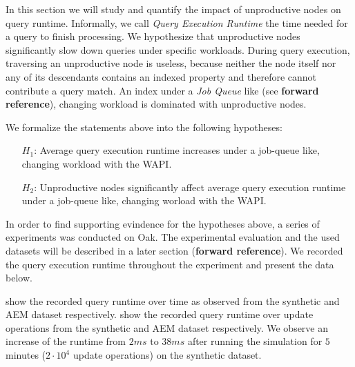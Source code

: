 \documentclass[abstracton,12pt]{scrartcl}
\theoremstyle{definition}
\begin{document}
In this section we will study and quantify the impact of unproductive nodes on
query runtime. Informally, we call \textit{Query Execution Runtime} the time
needed for a query to finish processing. We hypothesize that unproductive nodes
significantly slow down queries under specific workloads. During query
execution, traversing an unproductive node is
useless, because neither the node itself nor any of its descendants contains
an indexed property and therefore cannot contribute a query match.
An index under a \textit{Job Queue} like (see \textbf{forward reference}),
changing workload is dominated with unproductive nodes.

We formalize the statements above into the following hypotheses:

\begin{shaded}
  \begin{itemize}
  \item[$H_1$:] Average query execution runtime increases under a job-queue
    like, changing workload with the WAPI.
  \item[$H_2$:] Unproductive nodes significantly affect average query execution
    runtime under a job-queue like, changing worload with the WAPI.
  \end{itemize}
\end{shaded}

In order to find supporting evindence for the hypotheses above, a series of
experiments was conducted on Oak. The experimental evaluation and the used
datasets will be described in a later section (\textbf{forward reference}). We
recorded  the query execution runtime throughout the experiment and present the data below.

 show the
recorded query runtime over time as observed from the synthetic and AEM dataset respectively. 
 show the
recorded query runtime over update operations from the synthetic and AEM dataset respectively. 
We observe an increase of the runtime from $2 ms$ to $38 ms$
after running the simulation for $5$ minutes ($2 \cdot 10^4$ update operations)
on the synthetic dataset.
\end{document}
